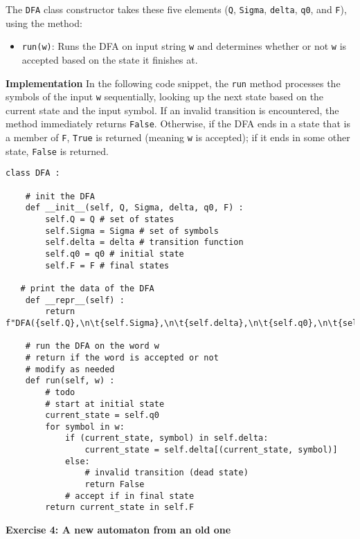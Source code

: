 \documentclass{article}
\theoremstyle{theorem}
\theoremstyle{definition}
\theoremstyle{remark}
\begin{document}
The \texttt{DFA} class constructor takes these five elements (\texttt{Q}, \texttt{Sigma}, \texttt{delta}, \texttt{q0}, and \texttt{F}), using the method:
\begin{itemize}
  \item \texttt{run(w)}: Runs the DFA on input string \texttt{w} and determines whether or not \texttt{w} is accepted based on the state it finishes at.
\end{itemize}

\textbf{Implementation}
In the following code snippet, the \texttt{run} method processes the symbols of the input \texttt{w} sequentially, looking up the next state based on the current state and the input symbol. If an invalid transition is encountered, the method immediately returns \texttt{False}. Otherwise, if the DFA ends in a state that is a member of \texttt{F}, \texttt{True} is returned (meaning \texttt{w} is accepted); if it ends in some other state, \texttt{False} is returned.

\begin{lstlisting}
class DFA :

    # init the DFA
    def __init__(self, Q, Sigma, delta, q0, F) : 
        self.Q = Q # set of states
        self.Sigma = Sigma # set of symbols
        self.delta = delta # transition function
        self.q0 = q0 # initial state
        self.F = F # final states
   
   # print the data of the DFA
    def __repr__(self) :
        return f"DFA({self.Q},\n\t{self.Sigma},\n\t{self.delta},\n\t{self.q0},\n\t{self.F})"

    # run the DFA on the word w
    # return if the word is accepted or not
    # modify as needed
    def run(self, w) :
        # todo
        # start at initial state
        current_state = self.q0
        for symbol in w:
            if (current_state, symbol) in self.delta:
                current_state = self.delta[(current_state, symbol)]
            else:
                # invalid transition (dead state)
                return False
            # accept if in final state
        return current_state in self.F 

\end{lstlisting}

\textbf{Exercise 4: A new automaton from an old one}
\end{document}
